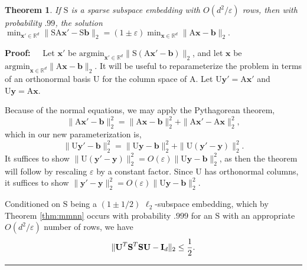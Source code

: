 \documentclass[11pt]{article}
\newtheorem{theorem}{Theorem}
\newenvironment{proof}{\begin{trivlist} \item {\bf Proof:~~}}
  {\qed\end{trivlist}}
\newcommand{\mat}[1]{{\ensuremath{\bm{\mathrm{#1}}}}}
\def\b{{\mathbf b}}
\def\matA{\mat{A}}
\def\matI{\mat{I}}
\def\matS{\mat{S}}
\def\matU{\mat{U}}
\def\frac#1#2{{#1\over #2}}
\def\qed{\hfill\rule{2mm}{2mm}}
\def\x{{\mathbf x}}
\def\y{{\mathbf y}}
\def\b{{\mathbf b}}
\newcommand{\eps}{\varepsilon}
\begin{document}
\begin{theorem}\label{thm:1eps}
If $\matS$ is a sparse subspace embedding with $O(d^2/\eps)$ rows, then with probability $.99$, the solution
$\min_{\x' \in \mathbb{R}^d}\|\matS\matA\x' -\matS \b\|_2
= (1 \pm \eps) \min_{\x \in \mathbb{R}^d}\|\matA\x-\b\|_2.$
\end{theorem}
\begin{proof}
Let $\x'$ be $\textrm{argmin}_{\x' \in \mathbb{R}^d} \|\matS(\matA \x' -\b)\|_2$, and 
let $\x$ be $\textrm{argmin}_{\x \in \mathbb{R}^d} \|\matA \x-\b\|_2$. It will be useful to reparameterize the problem
in terms of an orthonormal basis $\matU$ for the column space of $\matA$. Let $\matU \y' = \matA \x'$ and
$\matU \y = \matA \x$. 

Because of the normal equations, we may apply the Pythagorean theorem,
$$\|\matA\x'-\b\|_2^2 = \|\matA\x-\b\|_2^2 + \|\matA\x' - \matA\x \|_2^2,$$
which in our new parameterization is,
$$\|\matU\y'-\b\|_2^2 = \|\matU \y - \b\|_2^2 + \|\matU(\y'-\y)\|_2^2.$$
It suffices to show
$\|\matU(\y' - \y)\|_2^2 = O(\eps)\|\matU\y-\b\|_2^2$, as then the theorem will follow by rescaling $\eps$ by a constant 
factor. Since $\matU$ has orthonormal columns, it suffices to show $\|\y'-\y\|_2^2 = O(\eps) \|\matU\y-\b\|_2^2.$

Conditioned on $\matS$ being a $(1 \pm 1/2)$ $\ell_2$-subspace embedding,
which by Theorem \ref{thm:mmnn} occurs with probability $.999$ for an $\matS$ with an appropriate $O(d^2/\eps)$ number
of rows, we have 
\begin{eqnarray}\label{eqn:seReg}
\|\matU^T \matS^T \matS \matU - \matI_d\|_2 \leq \frac{1}{2}.
\end{eqnarray}


\end{proof}
\end{document}
